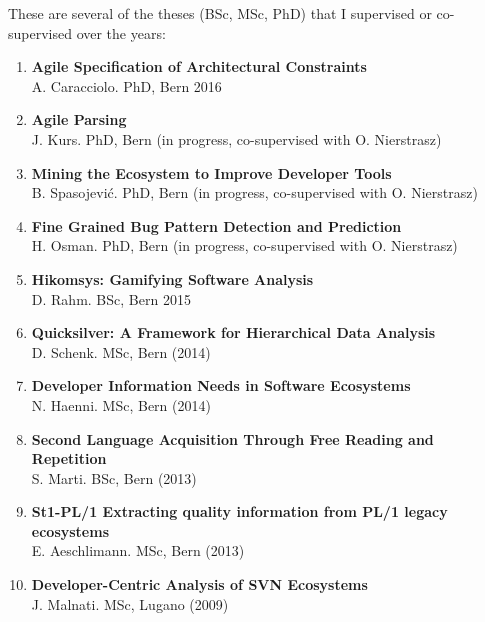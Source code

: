
\newcommand{\super}[5]{\item {\bf #2}\\ #1. #3, #4 #5}
\newcommand{\inprogr}{{\footnotesize(in progress)}}
\newcommand{\inprogrcosup}{{\footnotesize(in progress, co-supervised with O. Nierstrasz)}}

\newcommand{\yr}[1]{(#1)}

These are several of the theses (BSc, MSc, PhD) that I supervised or co-supervised over the years:

\begin{enumerate}


\super 
	{A. Caracciolo}
	{Agile Specification of Architectural Constraints}
	{PhD}
	{Bern}
	{2016}

\super 
	{J. Kurs}
	{Agile Parsing}
	{PhD}
	{Bern}
	{\inprogrcosup}	

\super 
	{B. Spasojevi\'{c}}
	{Mining the Ecosystem to Improve Developer Tools}
	{PhD}
	{Bern}
	{\inprogrcosup}

\super 
	{H. Osman}
	{Fine Grained Bug Pattern Detection and Prediction}
	{PhD}
	{Bern}
	{\inprogrcosup}	



\super 
	{D. Rahm}
	{Hikomsys: Gamifying Software Analysis}
	{BSc}
	{Bern}
	{2015}


\super 
	{D. Schenk}
	{Quicksilver: A Framework for Hierarchical Data Analysis}
	{MSc}
	{Bern}
	{\yr{2014}}

\super 
	{N. Haenni}
	{Developer Information Needs in Software Ecosystems}
	{MSc}
	{Bern}
	{\yr{2014}}

\super 
	{S. Marti}
	{Second Language Acquisition Through Free Reading and Repetition}
	{BSc}
	{Bern}
	{\yr{2013}}

\super 
	{E. Aeschlimann}
	{St1-PL/1
Extracting quality information from PL/1 legacy ecosystems}
	{MSc}
	{Bern}
	{\yr{2013}}



\super 
	{J. Malnati}
	{Developer-Centric Analysis of SVN Ecosystems}
	{MSc}
	{Lugano}
	{\yr{2009}}



\end{enumerate}